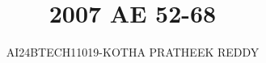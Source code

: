 \documentclass[journal]{IEEEtran}
\begin{document}

\vspace{3cm}

\title{2007 AE 52-68}
\author{AI24BTECH11019-KOTHA PRATHEEK REDDY}

 \maketitle
{\let\newpage\relax\maketitle}

\renewcommand{\thefigure}{\theenumi}
\renewcommand{\thetable}{\theenumi}
\setlength{\intextsep}{10pt} %


\renewcommand{\thetable}{\theenumi}
\end{document}
